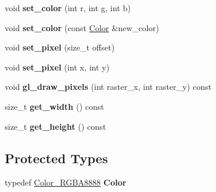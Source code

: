 \begin{DoxyCompactItemize}
\mbox{\label{classexample_1_1_texture_a01f247856758f3efe44dcc881025727a}} 
void {\bfseries set\+\_\+color} (int r, int g, int b)
\item 
\mbox{\label{classexample_1_1_texture_a4f84f758f032c40a79bb83685e984721}} 
void {\bfseries set\+\_\+color} (const \mbox{\hyperlink{classexample_1_1_color___r_g_b_a8888}{Color}} \&new\+\_\+color)
\item 
\mbox{\label{classexample_1_1_texture_a9edbba6d6955d8881f44602f40952b47}} 
void {\bfseries set\+\_\+pixel} (size\+\_\+t offset)
\item 
\mbox{\label{classexample_1_1_texture_a942683c708c7d86b87412ac1437f3e9c}} 
void {\bfseries set\+\_\+pixel} (int x, int y)
\item 
\mbox{\label{classexample_1_1_texture_a43bc6a61c0d404731c14e29b17155e2d}} 
void {\bfseries gl\+\_\+draw\+\_\+pixels} (int raster\+\_\+x, int raster\+\_\+y) const
\item 
\mbox{\label{classexample_1_1_texture_afe1cf0dbc7f72d889228c0d88251fdad}} 
size\+\_\+t {\bfseries get\+\_\+width} () const
\item 
\mbox{\label{classexample_1_1_texture_a11061d6418ec5293af3553b811aa4bdd}} 
size\+\_\+t {\bfseries get\+\_\+height} () const
\end{DoxyCompactItemize}
\subsection*{Protected Types}
\begin{DoxyCompactItemize}
\item 
\mbox{\label{classexample_1_1_texture_aa43483c200a7aa396cab2c0cd65c5eed}} 
typedef \mbox{\hyperlink{classexample_1_1_color___r_g_b_a8888}{Color\+\_\+\+R\+G\+B\+A8888}} {\bfseries Color}
\end{DoxyCompactItemize}
